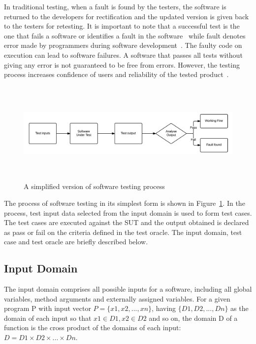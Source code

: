 In traditional testing, when a fault is found by the testers, the software is returned to the developers for rectification and the updated version is given back to the testers for retesting. It is important to note that a successful test is the one that fails a software or identifies a fault in the software~\cite{myers2011art} while fault denotes error made by programmers during software development~\cite{american1984}. The faulty code on execution can lead to software failures. A software that passes all tests without giving any error is not guaranteed to be free from errors. However, the testing process increases confidence of users and reliability of the tested product~\cite{dahl1972structured}. 

\bigskip
\begin{figure}[h]
	\centering
	\centerline{\includegraphics[width=16cm, height=5cm]{chapter2/softwareTesting.png}}
	\bigskip
	\caption{A simplified version of software testing process}
	\label{fig:softwareTestingParts_2}
\end{figure}
\bigskip

The process of software testing in its simplest form is shown in Figure~\ref{fig:softwareTestingParts_2}. In the process, test input data selected from the input domain is used to form test cases. The test cases are executed against the SUT and the output obtained is declared as pass or fail on the criteria defined in the test oracle. The input domain, test case and test oracle are briefly described below.

\subsection{Input Domain} 
The input domain comprises all possible inputs for a software, including all global variables, method arguments and externally assigned variables. For a given program P with input vector $ P =\{x1, x2, . . . , xn\}$, having $\{D1, D2, . . . , Dn\}$ as the domain of each input so that $x1 \in D1, x2 \in D2$ and so on, the domain D of a function is the cross product of the domains of each input: $D = D1 \times D2 \times . . . \times Dn$.

